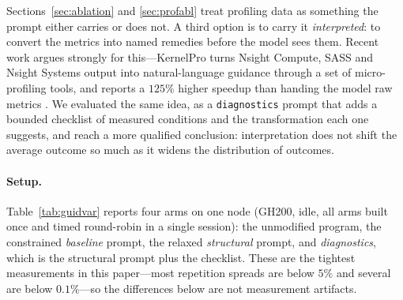 Sections~\ref{sec:ablation} and \ref{sec:profabl} treat profiling data as something the prompt either
carries or does not. A third option is to carry it \emph{interpreted}: to convert the metrics into
named remedies before the model sees them. Recent work argues strongly for this---KernelPro turns
Nsight Compute, SASS and Nsight Systems output into natural-language guidance through a set of
micro-profiling tools, and reports a $125\%$ higher speedup than handing the model raw metrics
\cite{gai2026kernelpro}. We evaluated the same idea, as a \texttt{diagnostics} prompt that adds a
bounded checklist of measured conditions and the transformation each one suggests, and reach a more
qualified conclusion: interpretation does not shift the average outcome so much as it widens the
distribution of outcomes.

\paragraph{Setup.}
Table~\ref{tab:guidvar} reports four arms on one node (GH200, idle, all arms built once and timed
round-robin in a single session): the unmodified program, the constrained \emph{baseline} prompt, the
relaxed \emph{structural} prompt, and \emph{diagnostics}, which is the structural prompt plus the
checklist. These are the tightest measurements in this paper---most repetition spreads are below $5\%$
and several are below $0.1\%$---so the differences below are not measurement artifacts.

